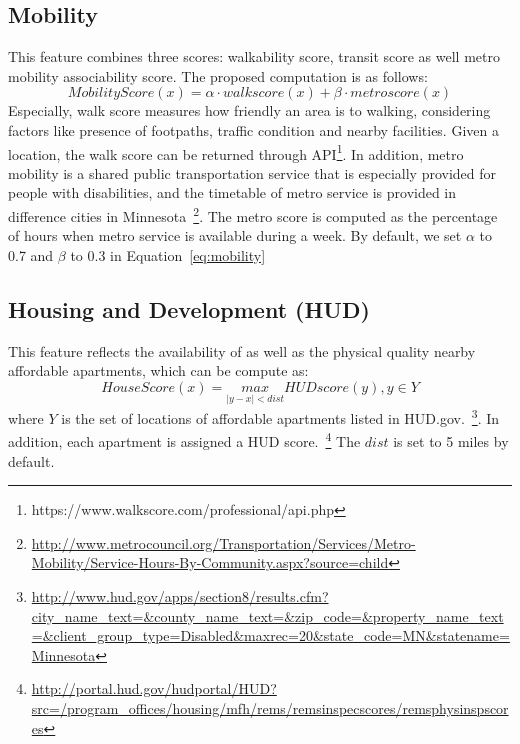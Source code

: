 \documentclass[10pt]{article}
\begin{document}
\subsection{Mobility}
This feature combines three scores: walkability score, transit score as well metro mobility associability score.  The proposed computation is as follows:
\begin{equation}
MobilityScore(x) = \alpha \cdot walkscore(x) + \beta \cdot metroscore(x)
\label{eq:mobility}
\end{equation}
Especially, walk score measures how friendly an area is to walking, considering factors like presence of footpaths, traffic condition and nearby facilities. Given a location, the walk score can be returned through API\footnote{https://www.walkscore.com/professional/api.php}. In addition, metro mobility is a shared public transportation service that is especially provided for people with disabilities, and the timetable of metro service is provided in difference cities in Minnesota~\footnote{\url{http://www.metrocouncil.org/Transportation/Services/Metro-Mobility/Service-Hours-By-Community.aspx?source=child}}. The metro score 
is computed as the percentage of hours when metro service is available during a week. By default, we set $\alpha$ to 0.7 and $\beta$ to 0.3 in Equation~\ref{eq:mobility}

\subsection{Housing and Development (HUD)}
This feature reflects the availability of as well as the physical quality nearby affordable apartments, which can be compute as:
\begin{equation}
HouseScore(x) = \underset{|y-x|<dist}{max}HUDscore(y), y\in Y
\label{eq:house}
\end{equation}
where $Y$ is the set of locations of affordable apartments listed in HUD.gov.~\footnote{\url{http://www.hud.gov/apps/section8/results.cfm?city_name_text=&county_name_text=&zip_code=&property_name_text=&client_group_type=Disabled&maxrec=20&state_code=MN&statename=Minnesota}}. In addition, each apartment is assigned a HUD score.~\footnote{\url{http://portal.hud.gov/hudportal/HUD?src=/program_offices/housing/mfh/rems/remsinspecscores/remsphysinspscores}} The $dist$ is set to 5 miles by default.
\end{document}
